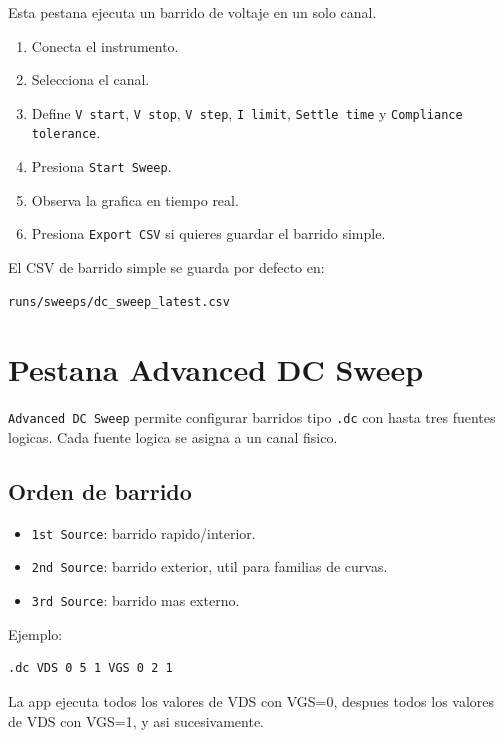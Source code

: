\documentclass[11pt,letterpaper]{article}
\begin{document}
Esta pestana ejecuta un barrido de voltaje en un solo canal.

\begin{enumerate}
  \item Conecta el instrumento.
  \item Selecciona el canal.
  \item Define \texttt{V start}, \texttt{V stop}, \texttt{V step},
        \texttt{I limit}, \texttt{Settle time} y \texttt{Compliance tolerance}.
  \item Presiona \texttt{Start Sweep}.
  \item Observa la grafica en tiempo real.
  \item Presiona \texttt{Export CSV} si quieres guardar el barrido simple.
\end{enumerate}

El CSV de barrido simple se guarda por defecto en:

\begin{verbatim}
runs/sweeps/dc_sweep_latest.csv
\end{verbatim}

\section{Pestana Advanced DC Sweep}

\texttt{Advanced DC Sweep} permite configurar barridos tipo \texttt{.dc} con
hasta tres fuentes logicas. Cada fuente logica se asigna a un canal fisico.

\subsection{Orden de barrido}

\begin{itemize}
  \item \texttt{1st Source}: barrido rapido/interior.
  \item \texttt{2nd Source}: barrido exterior, util para familias de curvas.
  \item \texttt{3rd Source}: barrido mas externo.
\end{itemize}

Ejemplo:

\begin{verbatim}
.dc VDS 0 5 1 VGS 0 2 1
\end{verbatim}

La app ejecuta todos los valores de VDS con VGS=0, despues todos los valores de
VDS con VGS=1, y asi sucesivamente.
\end{document}
